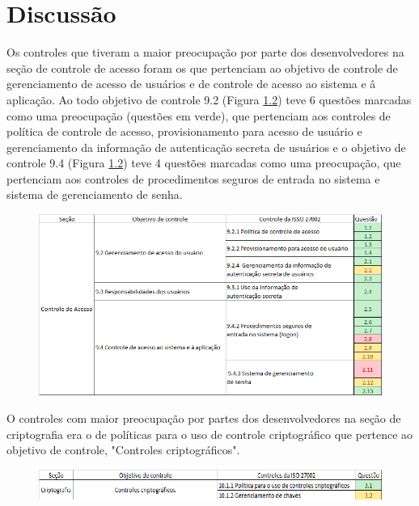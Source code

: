  \chapter{\label{chap:intro}Discussão}
 
Os controles que tiveram a maior preocupação por parte dos desenvolvedores na seção de controle de acesso foram os que pertenciam ao objetivo de controle de gerenciamento de acesso de usuários e de controle de acesso ao sistema e â aplicação. Ao todo objetivo de controle 9.2 (Figura \ref{fig:cont}) teve 6 questões marcadas como uma preocupação (questões em verde), que pertenciam aos controles de política de controle de acesso, provisionamento para acesso de usuário e gerenciamento da informação de autenticação secreta de usuários e o objetivo de controle 9.4 (Figura \ref{fig:cont}) teve 4 questões marcadas como uma preocupação, que pertenciam aos controles de procedimentos seguros de entrada no sistema e sistema de gerenciamento de senha. 

\begin{figure}[H]
\centering
\includegraphics[scale=0.8]{fig2/controles1.png}
\caption{}
\label{fig:cont}
\end{figure}


O controles com maior preocupação por partes dos desenvolvedores na seção de criptografia era o de políticas para o uso de controle criptográfico que pertence ao objetivo de controle, "Controles criptográficos".

\begin{figure}[H]
\centering
\includegraphics[scale=0.8]{fig2/controles2.png}
\caption{}
\label{fig:cont}
\end{figure}


